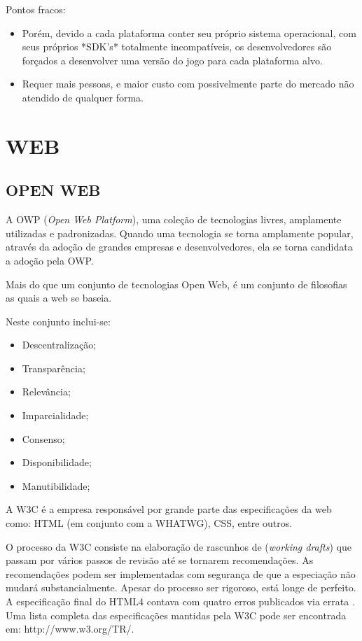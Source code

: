 Pontos fracos:
\begin{itemize}
\item Porém, devido a cada plataforma conter seu próprio sistema operacional,
com seus próprios *SDK's* totalmente incompatíveis, os desenvolvedores são
forçados a desenvolver uma versão do jogo para cada plataforma alvo.
\item Requer mais pessoas, e maior custo com possivelmente parte do
mercado não atendido de qualquer forma.
\end{itemize}

\section{WEB}

\subsection{OPEN WEB}
A OWP (\textit{Open Web Platform}), uma coleção de tecnologias livres,
amplamente utilizadas e padronizadas.
Quando uma tecnologia se torna amplamente popular, através da
adoção de grandes empresas e desenvolvedores, ela se torna candidata a
adoção pela OWP.

Mais do que um conjunto de tecnologias Open Web, é um conjunto de
filosofias as quais a web se baseia.

Neste conjunto inclui-se:
\begin{itemize}
\item Descentralização;
\item Transparência;
\item Relevância;
\item Imparcialidade;
\item Consenso;
\item Disponibilidade;
\item Manutibilidade;
\end{itemize}

A W3C é a empresa responsável por grande parte das especificações
da web como: HTML (em conjunto com a WHATWG), CSS, entre outros.

O processo da W3C consiste na elaboração de rascunhos de
(\textit{working drafts}) que passam por vários passos de revisão
até se tornarem recomendações. As recomendações podem ser implementadas com
segurança de que a especiação não mudará substancialmente.
Apesar do processo ser rigoroso, está longe de perfeito. A
especificação final do HTML4 contava com quatro erros publicados via
errata \autocite{HTML5}. Uma lista completa das especificações mantidas
pela W3C pode ser encontrada em: http://www.w3.org/TR/.


